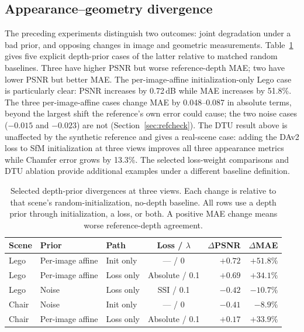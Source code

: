 \documentclass[10pt,a4paper]{article}
\begin{document}
\subsection{Appearance--geometry divergence}

The preceding experiments distinguish two outcomes: joint degradation under a bad
prior, and opposing changes in image and geometric measurements.
Table~\ref{tab:divergence} gives five explicit depth-prior cases of the latter
relative to matched random baselines. Three have higher PSNR but worse reference-depth
MAE; two have lower PSNR but better MAE. The per-image-affine initialization-only Lego
case is particularly clear: PSNR increases by 0.72\,dB while MAE increases by 51.8\%.
The three per-image-affine cases change MAE by 0.048--0.087 in absolute terms, beyond
the largest shift the reference's own error could cause; the two noise cases ($-0.015$
and $-0.023$) are not (Section~\ref{sec:refcheck}). The DTU result above is unaffected
by the synthetic reference and gives a real-scene case: adding the DAv2 loss to SfM
initialization at three views improves all three appearance metrics while Chamfer
error grows by 13.3\%. The selected loss-weight comparisons and DTU ablation provide
additional examples under a different baseline definition.

\begin{table}[!htbp]\centering\small
\caption{Selected depth-prior divergences at three views. Each change is relative to
that scene's random-initialization, no-depth baseline. All rows use a depth prior
through initialization, a loss, or both. A positive MAE change means worse
reference-depth agreement.}
\label{tab:divergence}
\begin{tabular}{lllcrr}
\toprule
Scene & Prior & Path & Loss / $\lambda$ & $\Delta$PSNR & $\Delta$MAE\\
\midrule
Lego & Per-image affine & Init only & --- / 0 & $+0.72$ & $+51.8\%$\\
Lego & Per-image affine & Loss only & Absolute / 0.1 & $+0.69$ & $+34.1\%$\\
Lego & Noise & Loss only & SSI / 0.1 & $-0.42$ & $-10.7\%$\\
Chair & Noise & Init only & --- / 0 & $-0.41$ & $-8.9\%$\\
Chair & Per-image affine & Loss only & Absolute / 0.1 & $+0.17$ & $+33.9\%$\\
\bottomrule
\end{tabular}
\end{table}
\end{document}

